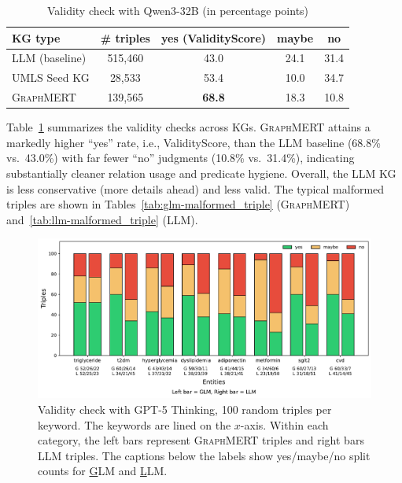 \documentclass[10pt]{article}
\newcommand{\ours}{\textsc{GraphMERT}\xspace}
\begin{document}
\begin{table}[t]
  \centering
  \caption{Validity check with Qwen3-32B (in percentage points)}
  \label{tab:validitycheck}
  \small
  \begingroup
  \setlength{\tabcolsep}{6pt}
  \begin{tabular}{l c c c c}
    \toprule
    \rowcolor{gray!30}
    \textbf{KG type} &
    \textbf{\# triples} &
    \textbf{yes (ValidityScore)} &
    \textbf{maybe} &
    \textbf{no}
    \\
    \midrule
    LLM (baseline) & 515,460 & 43.0 & 24.1 & 31.4\\
    UMLS Seed KG & 28,533 & 53.4 & 10.0 & 34.7 \\
    \ours  & 139,565 & \textbf{68.8} & 18.3 & 10.8 \\
    \bottomrule
  \end{tabular}
  \endgroup
\end{table}

Table~\ref{tab:validitycheck} summarizes the validity checks across KGs. 
\ours attains a markedly higher ``yes'' rate, i.e., ValidityScore, than the LLM baseline (68.8\% vs.\ 43.0\%) with far fewer ``no'' judgments (10.8\% vs.\ 31.4\%), indicating substantially cleaner relation usage and predicate hygiene. Overall, the LLM KG is less conservative (more details ahead) and less valid. The typical malformed triples are shown in Tables~\ref{tab:glm-malformed_triple} (\ours) and~\ref{tab:llm-malformed_triple} (LLM).

\begin{figure}[t!]
\centering
\includegraphics[width=\linewidth]{charts/verdict_bars.pdf}
\caption{Validity check with GPT-5 Thinking, 100 random triples per keyword. The keywords are lined on the $x$-axis. Within each category, the left bars represent \ours triples and right bars LLM triples. The captions below the labels show yes/maybe/no split counts for \underline{G}LM and \underline{L}LM.}
\label{fig:verdict_bars}
\end{figure}
\end{document}
